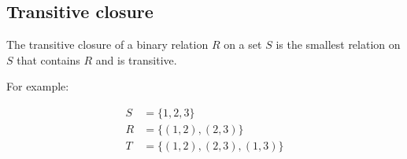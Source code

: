 \subsection*{Transitive closure}

The transitive closure of a binary relation $R$ on a set $S$ is the smallest relation on $S$ that contains $R$ and is transitive.

For example:

\begin{align*}
S &= \{1, 2, 3\} \\
R &= \{(1, 2), (2, 3)\} \\
T &= \{(1, 2), (2, 3), (1, 3)\}
\end{align*}
